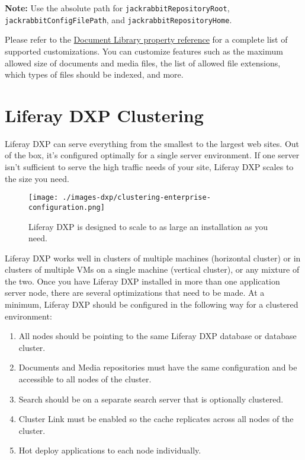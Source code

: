 \noindent\hrulefill

\textbf{Note:} Use the absolute path for
\texttt{jackrabbitRepositoryRoot}, \texttt{jackrabbitConfigFilePath},
and \texttt{jackrabbitRepositoryHome}.

\noindent\hrulefill

Please refer to the
\href{@platform-ref@/7.0-latest/propertiesdoc/portal.properties.html\#Document\%20Library\%20Portlet}{Document
Library property reference} for a complete list of supported
customizations. You can customize features such as the maximum allowed
size of documents and media files, the list of allowed file extensions,
which types of files should be indexed, and more.

\section{Liferay DXP Clustering}\label{liferay-dxp-clustering}

Liferay DXP can serve everything from the smallest to the largest web
sites. Out of the box, it's configured optimally for a single server
environment. If one server isn't sufficient to serve the high traffic
needs of your site, Liferay DXP scales to the size you need.

\begin{figure}
\centering
\texttt{[image: ./images-dxp/clustering-enterprise-configuration.png]}
\caption{Liferay DXP is designed to scale to as large an installation as
you need.}
\end{figure}

Liferay DXP works well in clusters of multiple machines (horizontal
cluster) or in clusters of multiple VMs on a single machine (vertical
cluster), or any mixture of the two. Once you have Liferay DXP installed
in more than one application server node, there are several
optimizations that need to be made. At a minimum, Liferay DXP should be
configured in the following way for a clustered environment:

\begin{enumerate}
\def\labelenumi{\arabic{enumi}.}
\item
  All nodes should be pointing to the same Liferay DXP database or
  database cluster.
\item
  Documents and Media repositories must have the same configuration and
  be accessible to all nodes of the cluster.
\item
  Search should be on a separate search server that is optionally
  clustered.
\item
  Cluster Link must be enabled so the cache replicates across all nodes
  of the cluster.
\item
  Hot deploy applications to each node individually.
\end{enumerate}

